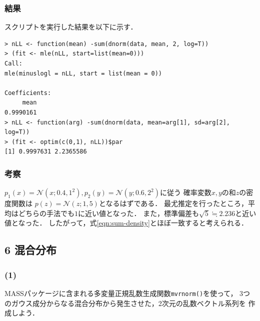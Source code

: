 \documentclass{jsarticle}
\begin{document}
\subsubsection*{結果}
スクリプトを実行した結果を以下に示す．
\begin{verbatim}
> nLL <- function(mean) -sum(dnorm(data, mean, 2, log=T))
> (fit <- mle(nLL, start=list(mean=0)))
Call:
mle(minuslogl = nLL, start = list(mean = 0))

Coefficients:
     mean 
0.9990161
> nLL <- function(arg) -sum(dnorm(data, mean=arg[1], sd=arg[2], log=T))
> (fit <- optim(c(0,1), nLL))$par
[1] 0.9997631 2.2365586

\end{verbatim}

\subsubsection*{考察}
$p_1(x)=\mathcal{N}(x;0.4, 1^2) , p_2(y)=\mathcal{N}(y;0.6, 2^2)$に従う
確率変数$x,y$の和$z$の密度関数は
$p(z)=\mathcal{N}(z; 1, 5)$となるはずである．
最尤推定を行ったところ，平均はどちらの手法でも$1$に近い値となった．
また，標準偏差も$\sqrt{5} \fallingdotseq 2.236$と近い値となった．
したがって，式\ref{eqn:sum-density}とほぼ一致すると考えられる．

\subsection*{6 混合分布}
\subsubsection*{(1)}
MASSパッケージに含まれる多変量正規乱数生成関数\verb|mvrnorm()|を使って，
3つのガウス成分からなる混合分布から発生させた，2次元の乱数ベクトル系列を
作成しよう．
\end{document}
